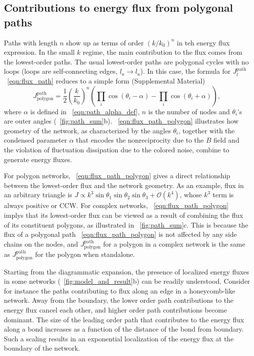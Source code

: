 \documentclass[
 preprint,
 preprintnumbers,
 amsmath,amssymb,
 aps,
 pre,
 longbibliography,
 superscriptaddress,
 10pt, twocolumn
]{revtex4-1}
\begin{document}
\subsection{Contributions to energy flux from polygonal paths}
Paths with length $n$ show up as terms of order $(k/k_0)^n$ in teh energy flux expression. In the small $k$ regime, the main contribution to the flux comes from the lowest-order paths.
The usual lowest-order paths are polygonal cycles with no loops (loops are self-connecting edges, $l_a\rightarrow l_a$). In this case, the formula for $J^\text{path}_l$ \eqnname~\eqref{eqn:flux_path} reduces to a simple form (Supplemental Material)
\begin{equation} \label{eqn:flux_path_polygon}
    J^\text{path}_\text{polygon} = \frac{1}{2} (\frac{k}{k_0})^n (\prod_i \cos(\theta_i - \alpha) - \prod_i \cos(\theta_i + \alpha)),
\end{equation}
where $\alpha$ is defined in \eqnname~\eqref{eqn:path_alpha_def}, $n$ is the number of nodes and $\theta_i$'s are outer angles (\figurename~\ref{fig:path_sum}b).
\eqnname~\ref{eqn:flux_path_polygon} illustrates how geometry of the network, as characterized by the angles $\theta_i$, together with the condensed parameter $\alpha$ that encodes the nonreciprocity due to the $B$ field and the violation of fluctuation dissipation due to the colored noise, combine to generate energy fluxes.

For polygon networks, \eqnname~\eqref{eqn:flux_path_polygon} gives a direct relationship between the lowest-order flux and the network geometry. As an example, flux in an arbitrary triangle is $J \propto k^3 \sin\theta_1\sin\theta_2\sin\theta_3 + \mathcal{O}(k^4)$, whose $k^3$ term is always positive or CCW.
For complex networks, \eqnname~\eqref{eqn:flux_path_polygon} implys that its lowest-order flux can be viewed as a result of combining the flux of its constituent polygons, as illustrated in \figurename~\ref{fig:path_sum}c. This is because the flux of a polygonal path \eqnname~\eqref{eqn:flux_path_polygon} is not affected by any side chains on the nodes, and $J^\text{path}_\text{polygon}$ for a polygon in a complex network is the same as $J^\text{path}_\text{polygon}$ for the polygon when standalone.

Starting from the  diagrammatic expansion, the presence of localized energy fluxes in some networks (\figurename~\ref{fig:model_and_result}b) can be readily understood. Consider for instance the paths contributing to flux along an edge in a honeycomb-like network. Away from the boundary, the lower order path contributions to the energy flux cancel each other, and higher order path contributions become dominant. The size of the leading order path that contributes to the energy flux along a bond increases as a function of the distance of the bond from boundary. Such a scaling results in an exponential localization of the energy flux at the boundary of the network.
\end{document}
